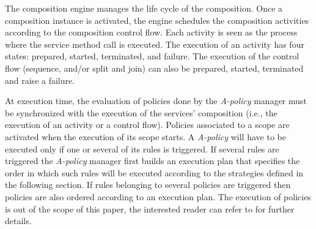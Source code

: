 The composition engine manages the life cycle of the composition. Once a composition instance is activated, the engine schedules the composition activities according to the composition control flow.
Each activity is seen as the process where the service method call is executed.
The execution of an activity has four states: prepared, started, terminated, and failure.
The execution of the control flow (sequence, and/or split and join) can also be prepared, started, terminated and raise a failure.

At execution time, the evaluation of policies done by the {\em A-policy} manager must be synchronized with the execution of the services' composition (i.e., the execution of an activity or a control flow).  Policies associated to a scope are activated when the execution of its scope starts. A {\em A-policy} will have to be executed only if one or several of its rules is triggered. If several rules are triggered the {\em A-policy} manager first builds an execution plan that specifies the order in which such rules will be executed according to the strategies defined in the following section. 
If rules belonging to several policies are triggered then policies are also ordered according to an execution plan. The execution of policies is out of the scope of this paper, the interested reader can refer to \cite{Espinosa-Oviedo2011a} for further details.


